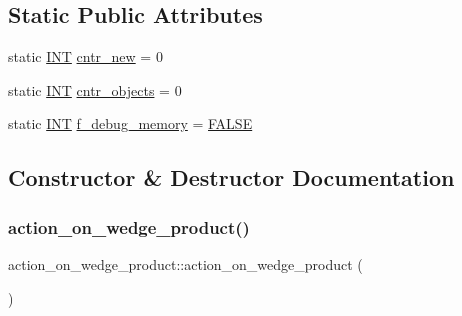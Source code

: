 \subsection*{Static Public Attributes}
\begin{DoxyCompactItemize}
\item 
static \mbox{\hyperlink{galois_8h_a09fddde158a3a20bd2dcadb609de11dc}{I\+NT}} \mbox{\hyperlink{classaction__on__wedge__product_a5c5e03cfdd4be46c6265abc2f6cb8b3a}{cntr\+\_\+new}} = 0
\item 
static \mbox{\hyperlink{galois_8h_a09fddde158a3a20bd2dcadb609de11dc}{I\+NT}} \mbox{\hyperlink{classaction__on__wedge__product_a8f487a22ac739cc8f9be8981449e9f42}{cntr\+\_\+objects}} = 0
\item 
static \mbox{\hyperlink{galois_8h_a09fddde158a3a20bd2dcadb609de11dc}{I\+NT}} \mbox{\hyperlink{classaction__on__wedge__product_a9837c0e7d324cc6b3193eb1a05cfffd0}{f\+\_\+debug\+\_\+memory}} = \mbox{\hyperlink{nauty_8h_aa93f0eb578d23995850d61f7d61c55c1}{F\+A\+L\+SE}}
\end{DoxyCompactItemize}


\subsection{Constructor \& Destructor Documentation}
\mbox{\label{classaction__on__wedge__product_ae3a5080e2a44475ec8d8b600fab71d9a}} 
\subsubsection{\texorpdfstring{action\+\_\+on\+\_\+wedge\+\_\+product()}{action\_on\_wedge\_product()}}
{\footnotesize\ttfamily action\+\_\+on\+\_\+wedge\+\_\+product\+::action\+\_\+on\+\_\+wedge\+\_\+product (\begin{DoxyParamCaption}{ }\end{DoxyParamCaption})}

\mbox{\label{classaction__on__wedge__product_a5a8182a912819b2de07b48b95b3a36cf}} 
